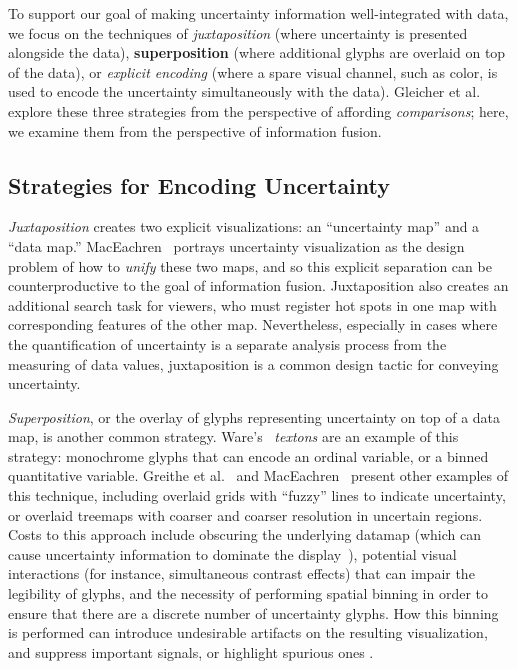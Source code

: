 \documentclass{vgtc}                          %
\begin{document}
To support our goal of making uncertainty information well-integrated with data, we focus on the techniques of \emph{juxtaposition} (where uncertainty is presented alongside the data), \textbf{superposition} (where additional glyphs are overlaid on top of the data), or \emph{explicit encoding} (where a spare visual channel, such as color, is used to encode the uncertainty simultaneously with the data). Gleicher et al.~\cite{gleicher2011visual} explore these three strategies from the perspective of affording \emph{comparisons}; here, we examine them from the perspective of information fusion.

\subsection{Strategies for Encoding Uncertainty}

\emph{Juxtaposition} creates two explicit visualizations: an ``uncertainty map'' and a ``data map.'' MacEachren~\cite{maceachren1992visualizing} portrays uncertainty visualization as the design problem of how to \emph{unify} these two maps, and so this explicit separation can be counterproductive to the goal of information fusion. Juxtaposition also creates an additional search task for viewers, who must register hot spots in one map with corresponding features of the other map. Nevertheless, especially in cases where the quantification of uncertainty is a separate analysis process from the measuring of data values, juxtaposition is a common design tactic for conveying uncertainty.

\emph{Superposition}, or the overlay of glyphs representing uncertainty on top of a data map, is another common strategy.  Ware's~\cite{ware2009quantitative} \emph{textons} are an example of this strategy: monochrome glyphs that can encode an ordinal variable, or a binned quantitative variable. Greithe et al.~\cite{griethe2006visualization} and MacEachren~\cite{maceachren1992visualizing,maceachren1998visualizing} present other examples of this technique, including overlaid grids with ``fuzzy'' lines to indicate uncertainty, or overlaid treemaps with coarser and coarser resolution in uncertain regions. Costs to this approach include obscuring the underlying datamap (which can cause uncertainty information to dominate the display~\cite{brodlie2012review}), potential visual interactions (for instance, simultaneous contrast effects) that can impair the legibility of glyphs, and the necessity of performing spatial binning in order to ensure that there are a discrete number of uncertainty glyphs. How this binning is performed can introduce undesirable artifacts on the resulting visualization, and suppress important signals, or highlight spurious ones \cite{battersby2016shapes}. 
\end{document}

